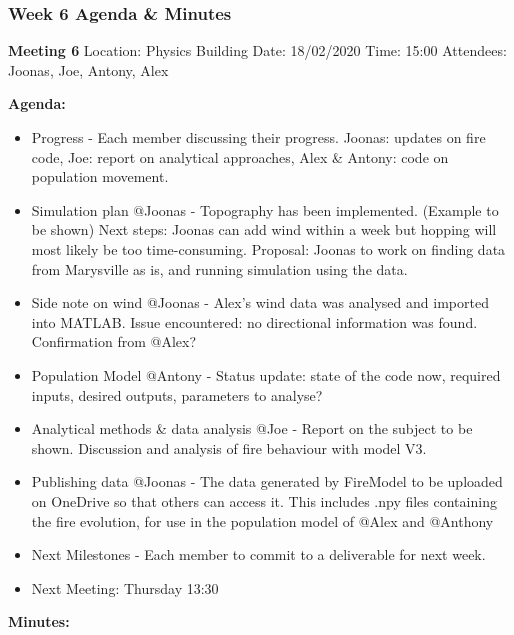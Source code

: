 \subsubsection*{Week 6 Agenda \& Minutes}
\textbf{Meeting 6}\newline
Location: Physics Building\newline
Date: 18/02/2020\newline
Time: 15:00\newline
Attendees: Joonas, Joe, Antony, Alex

\noindent \textbf{Agenda:}
\begin{itemize}
    \item Progress - Each member discussing their progress. Joonas: updates on fire code, Joe: report on analytical approaches, Alex \& Antony: code on population movement.
    \item Simulation plan @Joonas - Topography has been implemented. (Example to be shown) Next steps: Joonas can add wind within a week but hopping will most likely be too time-consuming. Proposal: Joonas to work on finding data from Marysville as is, and running simulation using the data.
    \item Side note on wind @Joonas - Alex’s wind data was analysed and imported into MATLAB. Issue encountered: no directional information was found. Confirmation from @Alex?
    \item Population Model @Antony - Status update: state of the code now, required inputs, desired outputs, parameters to analyse?
    \item Analytical methods \& data analysis @Joe - Report on the subject to be shown. Discussion and analysis of fire behaviour with model V3.
    \item Publishing data @Joonas - The data generated by FireModel to be uploaded on OneDrive so that others can access it. This includes .npy files containing the fire evolution, for use in the population model of @Alex and @Anthony 
    \item Next Milestones - Each member to commit to a deliverable for next week.
    \item Next Meeting: Thursday 13:30
\end{itemize}
\textbf{Minutes:}

